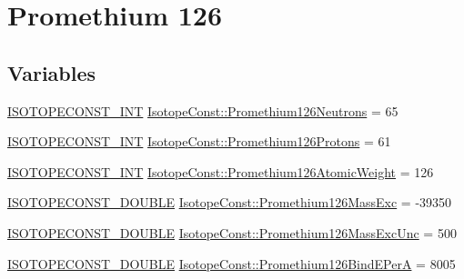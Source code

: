 \hypertarget{group___isotope_const-_promethium-_pm126}{}\section{Promethium 126}
\label{group___isotope_const-_promethium-_pm126}
\subsection*{Variables}
\begin{DoxyCompactItemize}
\item 
\mbox{\hyperlink{group___isotope_const-_macros_ga5f18360b3e99483a35c32d789e62621c}{I\+S\+O\+T\+O\+P\+E\+C\+O\+N\+S\+T\+\_\+\+I\+NT}} \mbox{\hyperlink{group___isotope_const-_promethium-_pm126_gac753156ae99647b3faf216ffdf23e04e}{Isotope\+Const\+::\+Promethium126\+Neutrons}} = 65
\item 
\mbox{\hyperlink{group___isotope_const-_macros_ga5f18360b3e99483a35c32d789e62621c}{I\+S\+O\+T\+O\+P\+E\+C\+O\+N\+S\+T\+\_\+\+I\+NT}} \mbox{\hyperlink{group___isotope_const-_promethium-_pm126_ga9967f8c4656071b390a85f4923e2c6b7}{Isotope\+Const\+::\+Promethium126\+Protons}} = 61
\item 
\mbox{\hyperlink{group___isotope_const-_macros_ga5f18360b3e99483a35c32d789e62621c}{I\+S\+O\+T\+O\+P\+E\+C\+O\+N\+S\+T\+\_\+\+I\+NT}} \mbox{\hyperlink{group___isotope_const-_promethium-_pm126_ga47ee8ad3a85f01111fa1ca607dab10aa}{Isotope\+Const\+::\+Promethium126\+Atomic\+Weight}} = 126
\item 
\mbox{\hyperlink{group___isotope_const-_macros_ga8f45a7272ce02c0b4c65c44636ed719a}{I\+S\+O\+T\+O\+P\+E\+C\+O\+N\+S\+T\+\_\+\+D\+O\+U\+B\+LE}} \mbox{\hyperlink{group___isotope_const-_promethium-_pm126_gaca05d9c799cbca3298f8144b8ae8e680}{Isotope\+Const\+::\+Promethium126\+Mass\+Exc}} = -\/39350
\item 
\mbox{\hyperlink{group___isotope_const-_macros_ga8f45a7272ce02c0b4c65c44636ed719a}{I\+S\+O\+T\+O\+P\+E\+C\+O\+N\+S\+T\+\_\+\+D\+O\+U\+B\+LE}} \mbox{\hyperlink{group___isotope_const-_promethium-_pm126_ga9255c1a29276b78ae465f8e9bbfe5d13}{Isotope\+Const\+::\+Promethium126\+Mass\+Exc\+Unc}} = 500
\item 
\mbox{\hyperlink{group___isotope_const-_macros_ga8f45a7272ce02c0b4c65c44636ed719a}{I\+S\+O\+T\+O\+P\+E\+C\+O\+N\+S\+T\+\_\+\+D\+O\+U\+B\+LE}} \mbox{\hyperlink{group___isotope_const-_promethium-_pm126_ga463977d6956d48a12d77d853838f3f60}{Isotope\+Const\+::\+Promethium126\+Bind\+E\+PerA}} = 8005
\item 

\end{DoxyCompactItemize}
